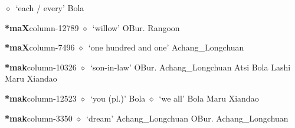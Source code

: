          $\diamond$~`each / every'
         Bola 
  \item {\footnotesize \textbf{*maX}}{\tiny column-12789}
         $\diamond$~`willow'
         OBur. 
\hspace{1ex}
         Rangoon 
  \item {\footnotesize \textbf{*maX}}{\tiny column-7496}
         $\diamond$~`one hundred and one'
         Achang\_Longchuan 
  \item {\footnotesize \textbf{*mak}}{\tiny column-10326}
         $\diamond$~`son-in-law'
         OBur. 
\hspace{1ex}
         Achang\_Longchuan 
\hspace{1ex}
         Atsi 
\hspace{1ex}
         Bola 
\hspace{1ex}
         Lashi 
\hspace{1ex}
         Maru 
\hspace{1ex}
         Xiandao 
  \item {\footnotesize \textbf{*mak}}{\tiny column-12523}
         $\diamond$~`you (pl.)'
         Bola 
\hspace{1ex}
         $\diamond$~`we all'
         Bola 
\hspace{1ex}
         Maru 
\hspace{1ex}
         Xiandao 
  \item {\footnotesize \textbf{*mak}}{\tiny column-3350}
         $\diamond$~`dream'
         Achang\_Longchuan 
\hspace{1ex}
         OBur. 
\hspace{1ex}
         Achang\_Longchuan 
